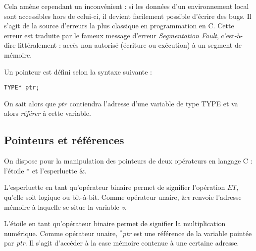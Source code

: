 \documentclass[../../../main.tex]{subfiles}
\begin{document}
Cela amène cependant un inconvénient : si les données d'un environnement local sont accessibles hors de celui-ci, il devient facilement possible d'écrire des bugs. Il s'agit de la source d'erreurs la plus classique en programmation en C. Cette erreur est traduite par le fameux message d'erreur \textit{Segmentation Fault}, c'est-à-dire littéralement : accès non autorisé (écriture ou exécution) à un segment de mémoire.
 
Un pointeur est défini selon la syntaxe suivante :
\begin{verbatim}
TYPE* ptr;
\end{verbatim}
On sait alors que $ptr$ contiendra l'adresse d'une variable de type \textsf{TYPE} et va alors \textit{référer} à cette variable.

\subsection{Pointeurs et références}

On dispose pour la manipulation des pointeurs de deux opérateurs en langage C : l'étoile $\ast$ et l'esperluette $\&$.

L'esperluette en tant qu'opérateur binaire permet de signifier l'opération $ET$, qu'elle soit logique ou bit-à-bit. Comme opérateur unaire, \textit{$\&$v} renvoie l'adresse mémoire à laquelle se situe la variable \textit{v}. 

L'étoile en tant qu'opérateur binaire permet de signifier la multiplication numérique. Comme opérateur unaire, \textit{$^*$ptr} est une référence de la variable pointée par \textit{ptr}. Il s'agit d'accéder à la case mémoire contenue à une certaine adresse.

\begin{minipage}{\textwidth}
	\begin{center}
		
	\end{center}
\end{minipage}
\end{document}
